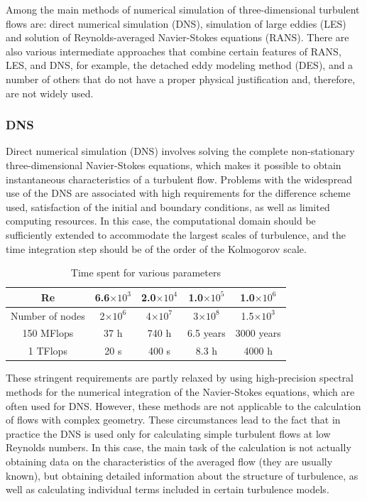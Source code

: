 	Among the main methods of numerical simulation of three-dimensional turbulent flows are: direct numerical simulation (DNS), simulation of large eddies (LES) and solution of Reynolds-averaged Navier-Stokes equations (RANS). There are also various intermediate approaches that combine certain features of RANS, LES, and DNS, for example, the detached eddy modeling method (DES), and a number of others that do not have a proper physical justification and, therefore, are not widely used.
	
\subsubsection{DNS}
	Direct numerical simulation (DNS) involves solving the complete non-stationary three-dimensional Navier-Stokes equations, which makes it possible to obtain instantaneous characteristics of a turbulent flow. Problems with the widespread use of the DNS are associated with high requirements for the difference scheme used, satisfaction of the initial and boundary conditions, as well as limited computing resources. In this case, the computational domain should be sufficiently extended to accommodate the largest scales of turbulence, and the time integration step should be of the order of the Kolmogorov scale.
	\begin{table}[H]
		\begin{center}
			\begin{tabular}{|c|c|c|c|c|}
				\hline
				Re & 6.6$\times10^3$ & 2.0$\times10^4$ & 1.0$\times10^5$ & 1.0$\times10^6$\\
				\hline
				Number of nodes & 2$\times10^6$ & 4$\times10^7$ & 3$\times10^8$ & 1.5$\times10^3$\\
				\hline
				150 MFlops & 37 h & 740 h & 6.5 years & 3000 years\\
				\hline
				1 TFlops & 20 s & 400 s & 8.3 h & 4000 h\\
				\hline
			\end{tabular}
		\end{center}
		\caption{\footnotesize{Time spent for various parameters}}
	\end{table}
	
	These stringent requirements are partly relaxed by using high-precision spectral methods for the numerical integration of the Navier-Stokes equations, which are often used for DNS. However, these methods are not applicable to the calculation of flows with complex geometry. These circumstances lead to the fact that in practice the DNS is used only for calculating simple turbulent flows at low Reynolds numbers. In this case, the main task of the calculation is not actually obtaining data on the characteristics of the averaged flow (they are usually known), but obtaining detailed information about the structure of turbulence, as well as calculating individual terms included in certain turbulence models.
	
